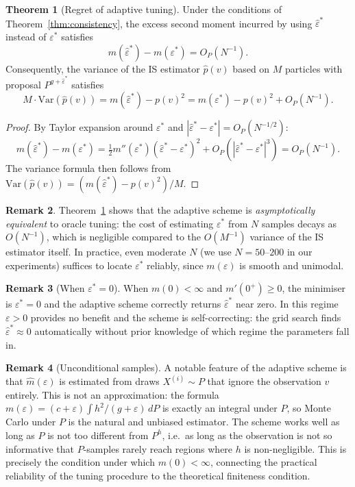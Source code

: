 \documentclass[11pt,reqno]{amsart}
\theoremstyle{definition}
\newtheorem{thm}{Theorem}
\newtheorem{rem}[thm]{Remark}
\begin{document}
\begin{thm}[Regret of adaptive tuning]
\label{thm:regret}
Under the conditions of Theorem~\ref{thm:consistency}, the excess second
moment incurred by using $\hat{\varepsilon}^*$ instead of $\varepsilon^*$ satisfies
\[
  m(\hat{\varepsilon}^*) - m(\varepsilon^*) = O_P(N^{-1}).
\]
Consequently, the variance of the IS estimator $\hat{p}(v)$ based on $M$
particles with proposal $P^{g+\hat{\varepsilon}^*}$ satisfies
\[
  M\cdot\mathrm{Var}(\hat{p}(v)) = m(\hat{\varepsilon}^*) - p(v)^2
  = m(\varepsilon^*) - p(v)^2 + O_P(N^{-1}).
\]
\end{thm}

\begin{proof}
By Taylor expansion around $\varepsilon^*$ and
$|\hat{\varepsilon}^*-\varepsilon^*|=O_P(N^{-1/2})$:
\[
  m(\hat{\varepsilon}^*) - m(\varepsilon^*)
  = \tfrac{1}{2}m''(\varepsilon^*)(\hat{\varepsilon}^*-\varepsilon^*)^2
    + O_P(|\hat{\varepsilon}^*-\varepsilon^*|^3)
  = O_P(N^{-1}).
\]
The variance formula then follows from
$\mathrm{Var}(\hat{p}(v)) = (m(\hat{\varepsilon}^*)-p(v)^2)/M$.
\end{proof}

\begin{rem}
Theorem~\ref{thm:regret} shows that the adaptive scheme is
\emph{asymptotically equivalent} to oracle tuning: the cost of estimating
$\varepsilon^*$ from $N$ samples decays as $O(N^{-1})$, which is negligible
compared to the $O(M^{-1})$ variance of the IS estimator itself. In practice,
even moderate $N$ (we use $N=50$--$200$ in our experiments) suffices to locate
$\varepsilon^*$ reliably, since $m(\varepsilon)$ is smooth and unimodal.
\end{rem}

\begin{rem}[When $\varepsilon^*=0$]
When $m(0)<\infty$ and $m'(0^+)\geq 0$, the minimiser is $\varepsilon^*=0$
and the adaptive scheme correctly returns $\hat{\varepsilon}^*$ near zero.
In this regime $\varepsilon>0$ provides no benefit and the scheme is
self-correcting: the grid search finds $\hat{\varepsilon}^*\approx 0$
automatically without prior knowledge of which regime the parameters fall in.
\end{rem}

\begin{rem}[Unconditional samples]
A notable feature of the adaptive scheme is that $\hat{m}(\varepsilon)$
is estimated from draws $X^{(i)}\sim P$ that ignore the observation $v$
entirely. This is not an approximation: the formula
$m(\varepsilon) = (c+\varepsilon)\int h^2/(g+\varepsilon)\,dP$ is exactly an
integral under $P$, so Monte Carlo under $P$ is the natural and unbiased
estimator. The scheme works well as long as $P$ is not too different from
$P^h$, i.e.\ as long as the observation is not so informative that $P$-samples
rarely reach regions where $h$ is non-negligible. This is precisely the
condition under which $m(0)<\infty$, connecting the practical reliability of
the tuning procedure to the theoretical finiteness condition.
\end{rem}
\end{document}

